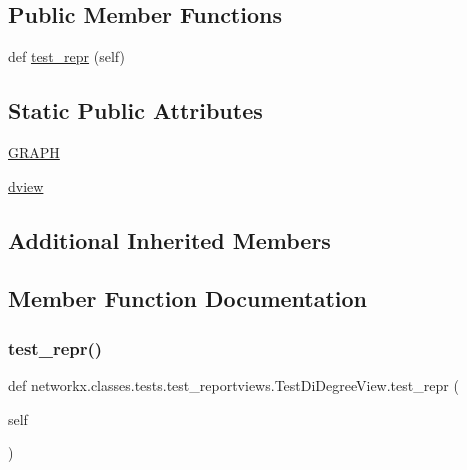 \subsection*{Public Member Functions}
\begin{DoxyCompactItemize}
\item 
def \hyperlink{classnetworkx_1_1classes_1_1tests_1_1test__reportviews_1_1TestDiDegreeView_aac197c3e5e018ba288decb0e7a162b16}{test\+\_\+repr} (self)
\end{DoxyCompactItemize}
\subsection*{Static Public Attributes}
\begin{DoxyCompactItemize}
\item 
\hyperlink{classnetworkx_1_1classes_1_1tests_1_1test__reportviews_1_1TestDiDegreeView_a88b5b4c9b49e0012668bc0ee686ffcd1}{G\+R\+A\+PH}
\item 
\hyperlink{classnetworkx_1_1classes_1_1tests_1_1test__reportviews_1_1TestDiDegreeView_af09a0c45daef80f2ec951de926ad6647}{dview}
\end{DoxyCompactItemize}
\subsection*{Additional Inherited Members}


\subsection{Member Function Documentation}
\mbox{\label{classnetworkx_1_1classes_1_1tests_1_1test__reportviews_1_1TestDiDegreeView_aac197c3e5e018ba288decb0e7a162b16}} 
\subsubsection{\texorpdfstring{test\+\_\+repr()}{test\_repr()}}
{\footnotesize\ttfamily def networkx.\+classes.\+tests.\+test\+\_\+reportviews.\+Test\+Di\+Degree\+View.\+test\+\_\+repr (\begin{DoxyParamCaption}\item[{}]{self }\end{DoxyParamCaption})}




